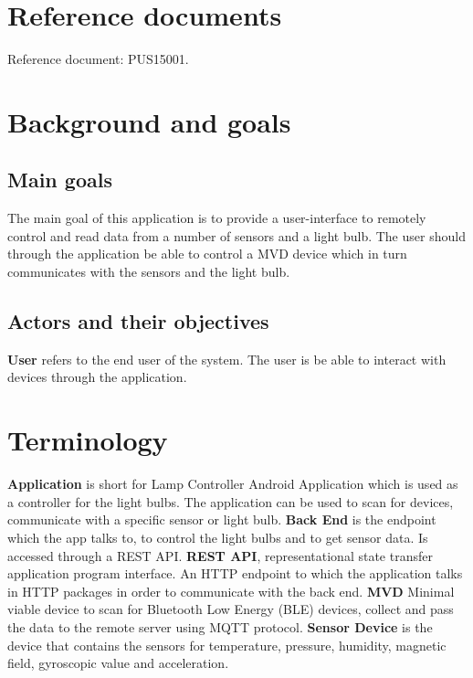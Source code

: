 \documentclass[a4paper]{article}
\begin{document}
\section{Reference documents}
Reference document: PUS15001.
\section{Background and goals}
\subsection{Main goals}
The main goal of this application is to provide a user-interface to remotely control and read data from a number of sensors and a light bulb. The user should through the application be able to control a MVD device which in turn communicates with the sensors and the light bulb.
\subsection{Actors and their objectives}

\textbf{User} refers to the end user of the system. The user is be able to interact with devices through the application. 

\section{Terminology}

\textbf{Application} is short for Lamp Controller Android Application which is used as a controller for the light bulbs. The application can be used to scan for devices, communicate with a specific sensor or light bulb. 
\newline \newline
\textbf{Back End} is the endpoint which the app talks to, to control the light bulbs and to get sensor data. Is accessed through a REST API. 
\newline \newline
\textbf{REST API}, representational state transfer application program interface. An HTTP endpoint to which the application talks in HTTP packages in order to communicate with the back end. 
\newline \newline
\textbf{MVD} Minimal viable device to scan for Bluetooth Low Energy (BLE) devices, collect and pass the data to the remote server using MQTT protocol.
\newline \newline
\textbf{Sensor Device} is the device that contains the sensors for temperature, pressure, humidity, magnetic field, gyroscopic value and acceleration.
\end{document}
